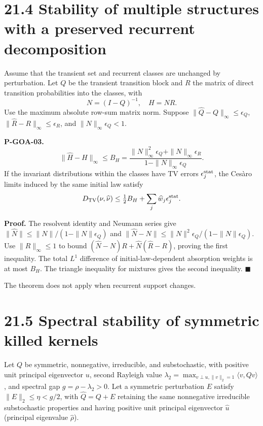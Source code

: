 \documentclass[
  english,
  11pt,
  oneside]{book}
\begin{document}
\section{21.4 Stability of multiple structures with a preserved recurrent decomposition}\label{stability-of-multiple-structures-with-a-preserved-recurrent-decomposition}

Assume that the transient set and recurrent classes are unchanged by perturbation. Let \(Q\) be the transient transition block and \(R\) the matrix of direct transition probabilities into the classes, with \[N=(I-Q)^{-1},\quad H=NR.\] Use the maximum absolute row-sum matrix norm. Suppose \(\|\widehat Q-Q\|_\infty\le\epsilon_Q\), \(\|\widehat R-R\|_\infty\le\epsilon_R\), and \(\|N\|_\infty\epsilon_Q<1\).

\hypertarget{p-goa-03}{}\label{p-goa-03}

\textbf{P-GOA-03.} \[\|\widehat H-H\|_\infty\le
B_H=
\frac{\|N\|_\infty^2\epsilon_Q+
\|N\|_\infty\epsilon_R}
{1-\|N\|_\infty\epsilon_Q}.\] If the invariant distributions within the classes have TV errors \(\epsilon_j^{\rm stat}\), the Cesàro limits induced by the same initial law satisfy \[D_{\rm TV}(\nu,\widehat\nu)
\le\tfrac12 B_H+\sum_j\widehat w_j\epsilon_j^{\rm stat}.\]

\textbf{Proof.} The resolvent identity and Neumann series give \(\|\widehat N\|\le\|N\|/(1-\|N\|\epsilon_Q)\) and \(\|\widehat N-N\|\le\|N\|^2\epsilon_Q/(1-\|N\|\epsilon_Q)\). Use \(\|R\|_\infty\le1\) to bound \((\widehat N-N)R+\widehat N(\widehat R-R)\), proving the first inequality. The total \(L^1\) difference of initial-law-dependent absorption weights is at most \(B_H\). The triangle inequality for mixtures gives the second inequality. \(\blacksquare\)

The theorem does not apply when recurrent support changes.

\section{21.5 Spectral stability of symmetric killed kernels}\label{spectral-stability-of-symmetric-killed-kernels}

Let \(Q\) be symmetric, nonnegative, irreducible, and substochastic, with positive unit principal eigenvector \(u\), second Rayleigh value \(\lambda_2=\max_{v\perp u,\|v\|_2=1}\langle v,Qv\rangle\), and spectral gap \(g=\rho-\lambda_2>0\). Let a symmetric perturbation \(E\) satisfy \(\|E\|_2\le\eta<g/2\), with \(\widehat Q=Q+E\) retaining the same nonnegative irreducible substochastic properties and having positive unit principal eigenvector \(\widehat u\) (principal eigenvalue \(\widehat\rho\)).
\end{document}
